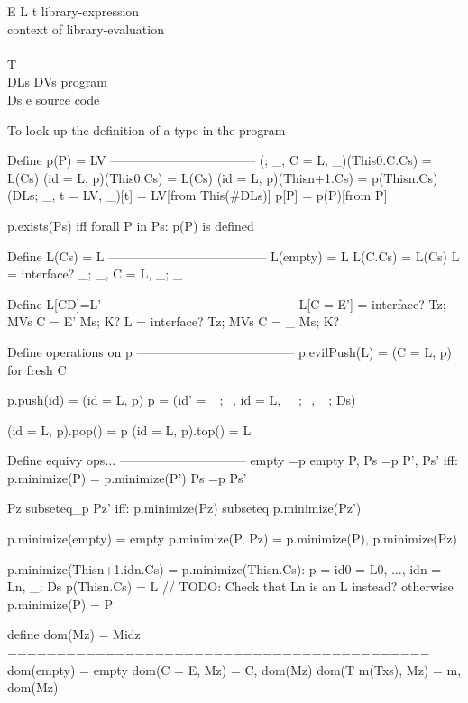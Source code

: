 \begin{bnf}
{E}      {L \mmid{} t \mmid{}  \mmid{} }           {library-expression}\\  {context of library-evaluation}\\           {}\\      { T}                                                 {}\\      {DLs\Q{;} DVs}                                                     {program}\\      {Ds e}                                                             {source code}
\end{bnf}

To look up the definition of a type in the program

Define p(P) = LV
-----------------------------------
(; _, C = L, _)(This0.C.Cs) = L(Cs)
(id = L, p)(This0.Cs)   = L(Cs)
(id = L, p)(Thisn+1.Cs) = p(Thisn.Cs)
(DLs; _, t = LV, _)[t] = LV[from This(#DLs)]
p[P] = p(P)[from P]

p.exists(Ps) iff forall P in Ps: p(P) is defined

Define L(Cs) = L
--------------------------------------
L(empty) = L
L(C.Cs) = L(Cs)
    L = interface? {_; _, C = L, _; _}

Define L[CD]=L'
---------------------------------------------
L[C = E'] = interface? {Tz; MVs C = E' Ms; K?}
  L = interface? {Tz; MVs C = _ Ms; K?}


Define operations on p
--------------------------------------
p.evilPush(L) = (C = L, p)
	for fresh C

p.push(id) = (id = L, p)
    p = (id' = {_;_, id = L, _ ;_}, _; Ds)

(id = L, p).pop() = p
(id = L, p).top() = L

Define equivy ops...
------------------------------
empty =p empty
P, Ps =p P', Ps' iff:
	p.minimize(P) = p.minimize(P')
	Ps =p Ps'

Pz subseteq_p Pz' iff:
	p.minimize(Pz) subseteq p.minimize(Pz')

p.minimize(empty) = empty
p.minimize(P, Pz) = p.minimize(P), p.minimize(Pz)

p.minimize(Thisn+1.idn.Cs) = p.minimize(Thisn.Cs):
  p = id0 = L0, ..., idn = Ln, _; Ds
  p(Thisn.Cs) = L
  // TODO: Check that Ln is an L instead?
otherwise p.minimize(P) = P

define dom(Mz) = Midz
===========================================
dom(empty) = empty
dom(C = E, Mz) = C, dom(Mz)
dom(T m(Txs), Mz) = m, dom(Mz)
